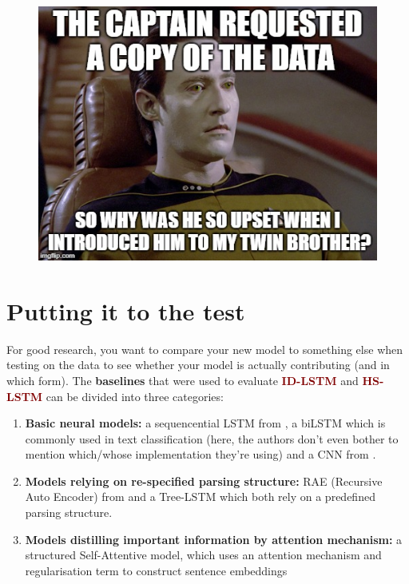 \documentclass{article}
\begin{document}
\begin{figure}[h]
    \centering

\includegraphics[scale=.5]{datatwin.jpg}
    \label{fig:my_label}
\end{figure}

\section{Putting it to the test} \label{sec:testing}
 For good research, you want to compare your new model to something else when testing on the data to see whether your model is actually contributing (and in which form). The \textbf{baselines} that were used to evaluate \textcolor{Maroon}{\textbf{ID-LSTM}} and \textcolor{Maroon}{\textbf{HS-LSTM}} can be divided into three categories:
\begin{enumerate}

    \item \textbf{Basic neural models:} a sequencential LSTM from \cite{tai-etal-2015}, a biLSTM which is commonly used in text classification (here, the authors don't even bother to mention which/whose implementation they're using) and a CNN from \cite{kim-2014}.
    \item \textbf{Models relying on re-specified parsing structure:} RAE (Recursive Auto Encoder) from \cite{socher-etal-2011} and a Tree-LSTM \citep{tai-etal-2015} which both rely on a predefined parsing structure.
    \item \textbf{Models distilling important information by attention mechanism:} a structured Self-Attentive model, which uses an attention mechanism and regularisation term to construct sentence embeddings \citep{lin2017}
\end{enumerate} \par
\end{document}
